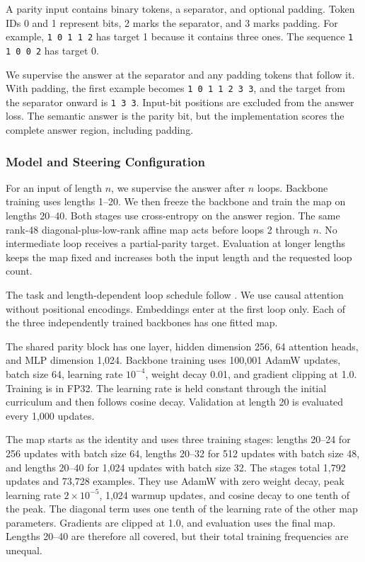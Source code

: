 \documentclass{article}
\begin{document}
A parity input contains binary tokens, a separator, and optional padding. Token IDs 0 and 1 represent bits, 2 marks the separator, and 3 marks padding. For example, \texttt{1 0 1 1 2} has target 1 because it contains three ones. The sequence \texttt{1 1 0 0 2} has target 0.

We supervise the answer at the separator and any padding tokens that follow it. With padding, the first example becomes \texttt{1 0 1 1 2 3 3}, and the target from the separator onward is \texttt{1 3 3}. Input-bit positions are excluded from the answer loss. The semantic answer is the parity bit, but the implementation scores the complete answer region, including padding.

\subsubsection{Model and Steering Configuration}

For an input of length $n$, we supervise the answer after $n$ loops. Backbone training uses lengths 1--20. We then freeze the backbone and train the map on lengths 20--40. Both stages use cross-entropy on the answer region. The same rank-48 diagonal-plus-low-rank affine map acts before loops 2 through $n$. No intermediate loop receives a partial-parity target. Evaluation at longer lengths keeps the map fixed and increases both the input length and the requested loop count.

The task and length-dependent loop schedule follow \citet{fan2025looped}. We use causal attention without positional encodings. Embeddings enter at the first loop only. Each of the three independently trained backbones has one fitted map.

The shared parity block has one layer, hidden dimension 256, 64 attention heads, and MLP dimension 1,024. Backbone training uses 100,001 AdamW updates, batch size 64, learning rate $10^{-4}$, weight decay 0.01, and gradient clipping at 1.0. Training is in FP32. The learning rate is held constant through the initial curriculum and then follows cosine decay. Validation at length 20 is evaluated every 1,000 updates.

The map starts as the identity and uses three training stages: lengths 20--24 for 256 updates with batch size 64, lengths 20--32 for 512 updates with batch size 48, and lengths 20--40 for 1,024 updates with batch size 32. The stages total 1,792 updates and 73,728 examples. They use AdamW with zero weight decay, peak learning rate $2\times10^{-5}$, 1,024 warmup updates, and cosine decay to one tenth of the peak. The diagonal term uses one tenth of the learning rate of the other map parameters. Gradients are clipped at 1.0, and evaluation uses the final map. Lengths 20--40 are therefore all covered, but their total training frequencies are unequal.
\end{document}
